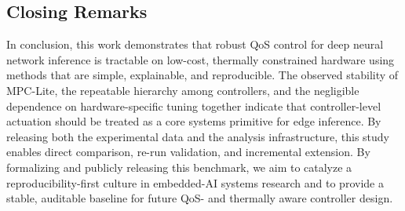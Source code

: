 \documentclass[acmsmall]{acmart}
\begin{document}
\subsection*{Closing Remarks}

In conclusion, this work demonstrates that robust QoS control for deep neural network inference is tractable on low-cost, thermally constrained hardware using methods that are simple, explainable, and reproducible.  
The observed stability of MPC-Lite, the repeatable hierarchy among controllers, and the negligible dependence on hardware-specific tuning together indicate that controller-level actuation should be treated as a core systems primitive for edge inference.  
By releasing both the experimental data and the analysis infrastructure, this study enables direct comparison, re-run validation, and incremental extension.  
By formalizing and publicly releasing this benchmark, we aim to catalyze a reproducibility-first culture in embedded-AI systems research and to provide a stable, auditable baseline for future QoS- and thermally aware controller design.



\end{document}
